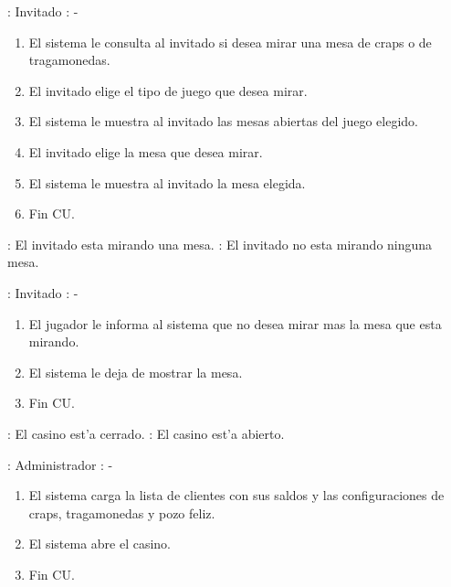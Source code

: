 : Invitado \newline
\indent{}: -

\begin{enumerate}
\item El sistema le consulta al invitado si desea mirar una mesa de craps o de tragamonedas.
\item El invitado elige el tipo de juego que desea mirar.
\item El sistema le muestra al invitado las mesas abiertas del juego elegido.
\item El invitado elige la mesa que desea mirar.
\item El sistema le muestra al invitado la mesa elegida.
\item Fin CU.
\end{enumerate}




: El invitado esta mirando una mesa. \newline
\indent{}: El invitado no esta mirando ninguna mesa.

: Invitado \newline
\indent{}: -

\begin{enumerate}
\item El jugador le informa al sistema que no desea mirar mas la mesa que esta mirando.
\item El sistema le deja de mostrar la mesa.
\item Fin CU.
\end{enumerate}




: El casino est'a cerrado. \newline
\indent{}: El casino est'a abierto.

: Administrador \newline
\indent{}: -

\begin{enumerate}
\item El sistema carga la lista de clientes con sus saldos y las configuraciones de craps, tragamonedas y pozo feliz.
\item El sistema abre el casino.
\item Fin CU.
\end{enumerate}





